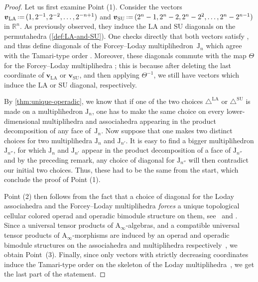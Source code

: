 \documentclass{amsart}
\theoremstyle{definition}
\newcommand{\R}{\mathbb{R}} %
\renewcommand{\b}[1]{{\boldsymbol{#1}}} %
\newcommand{\J}{\mathrm{J}} %
\newcommand{\eqdef}{\mbox{\,\raisebox{0.2ex}{\scriptsize\ensuremath{\mathrm:}}\ensuremath{=}\,}} %
\renewcommand{\b}[1]{\boldsymbol{#1}} %
\newcommand{\SU}{\mathrm{SU}}
\newcommand{\LA}{\mathrm{LA}}
\newcommand{\SUD}{\triangle^{\mathrm{SU}}}
\newcommand{\LAD}{\triangle^{\mathrm{LA}}}
\newcommand{\Ainf}{\ensuremath{\mathrm{A}_\infty}}
\begin{document}
\begin{proof}
Let us first examine Point (1).
Consider the vectors $\b{v}_\LA \eqdef (1,2^{-1},2^{-2},\ldots,2^{-n+1})$ and $\b{v}_\SU \eqdef (2^n-1,2^{n}-2,2^n-2^2,\ldots,2^n-2^{n-1})$ in $\R^n$.
As previously observed, they induce the $\LA$ and $\SU$ diagonals on the permutahedra (\cref{def:LA-and-SU}).
One checks directly that both vectors satisfy \cite[Prop. 2.7 \& 2.8]{LaplanteAnfossiMazuir}, and thus define diagonals of the Forcey--Loday multiplihedron~$\J_n$ which agree with the Tamari-type order \cite[Prop. 2.10]{LaplanteAnfossiMazuir}.
Moreover, these diagonals commute with the map $\Theta$ for the Forcey--Loday multiplihedra \cite[Prop. 2.14]{LaplanteAnfossiMazuir}; this is because after deleting the last coordinate of $\b{v}_\LA$ or $\b{v}_\SU$, and then applying $\Theta^{-1}$, we still have vectors which induce the $\LA$ or $\SU$ diagonal, respectively. 

By \cref{thm:unique-operadic}, we know that if one of the two choices $\LAD$ or $\SUD$ is made on a multiplihedron $\J_n$, one has to make the same choice on every lower-dimensional multiplihedra and associahedra appearing in the product decomposition of any face of~$\J_n$. 
Now suppose that one makes two distinct choices for two multiplihedra $\J_n$ and $\J_{n'}$.
It is easy to find a bigger multiplihedron $\J_{n''}$, for which $\J_n$ and $\J_{n'}$ appear in the product decomposition of a face of $\J_{n''}$ and by the preceding remark, any choice of diagonal for $\J_{n''}$ will then contradict our initial two choices. 
Thus, these had to be the same from the start, which conclude the proof of Point (1). 

Point (2) then follows from the fact that a choice of diagonal for the Loday associahedra and the Forcey--Loday multiplihedra \emph{forces} a unique topological cellular colored operad and operadic bimodule structure on them, see~\cite[Thm.~1]{MasudaThomasTonksVallette} and \cite[Thm.~1]{LaplanteAnfossiMazuir}.
Since a universal tensor products of $\Ainf$-algebras, and a compatible universal tensor products of $\Ainf$-morphisms are induced by an operad and operadic bimodule structures on the associahedra and multiplihedra respectively~\cite[Sec.~4.2.3]{LaplanteAnfossiMazuir}, we obtain Point~(3).
Finally, since only vectors with strictly decreasing coordinates induce the Tamari-type order on the skeleton of the Loday multiplihedra~\cite[Prop. 2.10]{LaplanteAnfossiMazuir}, we get the last part of the statement. 
\end{proof}
\end{document}

